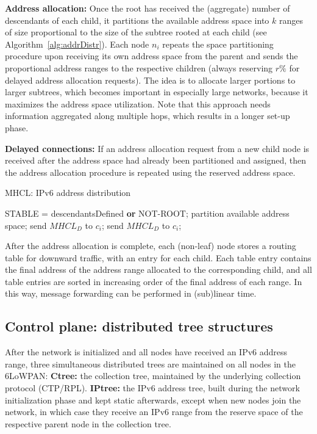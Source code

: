 \textbf{Address allocation:} Once the root has received the (aggregate) number of descendants of each child, it partitions the available address space into $k$ ranges of size proportional to the size of the subtree rooted at each child (see Algorithm~\ref{alg:addrDistr}). Each node $n_i$ repeats the space partitioning procedure upon receiving its own address space from the parent and sends the proportional address ranges to the respective children (always reserving $r\%$ for delayed address allocation requests). The idea is to allocate larger portions to larger subtrees, which becomes important in especially large networks, because it maximizes the address space utilization. Note that this approach needs information aggregated along multiple hops, which results in a longer set-up phase.

\textbf{Delayed connections:} If an address allocation request from a new child node is received after the address space had already been partitioned and assigned, then the address allocation procedure is repeated using the reserved address space.
  
\begin{algorithm}[h!]
\caption{MHCL: IPv6 address distribution}\label{alg:addrDistr}
\begin{algorithmic}[1]
 \State STABLE = descendantsDefined \textbf{or} NOT-ROOT;		
  	\State partition available address space;
		\State send $MHCL_{D}$ to $c_i$; 
			\State send $MHCL_{D}$ to $c_i$; 
		\EndIf
  	\EndFor		
  \EndIf
\end{algorithmic}
\end{algorithm}

After the address allocation is complete, each (non-leaf) node stores a routing table for downward traffic, with an entry for each child. Each table entry contains the final address of the address range allocated to the corresponding child, and all table entries are sorted in increasing order of the final address of each range. In this way, message forwarding can be performed in (sub)linear time. 



\subsection{Control plane: distributed tree structures}

After the network is initialized and all nodes have received an IPv6
address range, three simultaneous distributed trees are maintained
on all nodes in the 6LoWPAN: \textbf{Ctree:} the collection tree, maintained by the underlying collection protocol (CTP/RPL).
	\textbf{IPtree:} the IPv6 address tree, built during the network
  initialization phase and kept static afterwards, except when new
  nodes join the network, in which case they receive an IPv6 range from the reserve space of the respective
parent node in the collection tree.

